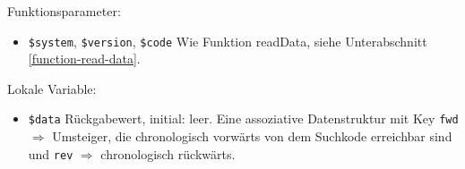 

Funktionsparameter:

\begin{itemize}
\item \texttt{\$system}, \texttt{\$version}, \texttt{\$code} \newline 
Wie Funktion readData, siehe Unterabschnitt \ref{function-read-data}.
\end{itemize}

Lokale Variable:

\begin{itemize}
\item \texttt{\$data} \hspace{2em} Rückgabewert, initial: leer.
\newline Eine assoziative Datenstruktur mit Key \texttt{fwd} $\Rightarrow$ Umsteiger, die chronologisch vorwärts von dem Suchkode erreichbar sind und \texttt{rev} $\Rightarrow$ chronologisch rückwärts. \\
\end{itemize}

{
}

